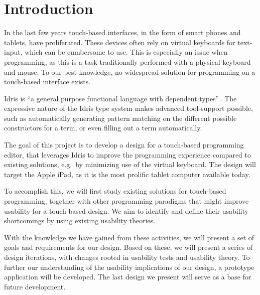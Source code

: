 \chapter{Introduction}
\label{sec:Introduction}
In the last few years touch-based interfaces, in the form of smart phones and tablets, have proliferated. These devices often rely on virtual keyboards for text-input, which can be cumbersome to use.
This is especially an issue when programming, as this is a task traditionally performed with a physical keyboard and mouse.
To our best knowledge, no widespread solution for programming on a touch-based interface exists.

Idris is ``a general purpose functional language with dependent types''\,\cite{brady2013idris}. The expressive nature of the Idris type system makes advanced tool-support possible, such as automatically generating pattern matching on the different possible constructors for a term, or even filling out a term automatically.

The goal of this project is to develop a design for a touch-based programming editor, that leverages Idris to improve the programming experience compared to existing solutions, e.g.\ by minimizing use of the virtual keyboard.
The design will target the Apple iPad, as it is the most prolific tablet computer available today.

To accomplish this, we will first study existing solutions for touch-based programming, together with other programming paradigms that might improve usability for a touch-based design.
We aim to identify and define their usability shortcomings by using existing usability theories.

With the knowledge we have gained from these activities, we will present a set of goals and requirements for our design.
Based on these, we will present a series of design iterations, with changes rooted in usability tests and usability theory.
To further our understanding of the usability implications of our design, a prototype application will be developed.
The last design we present will serve as a base for future development.

